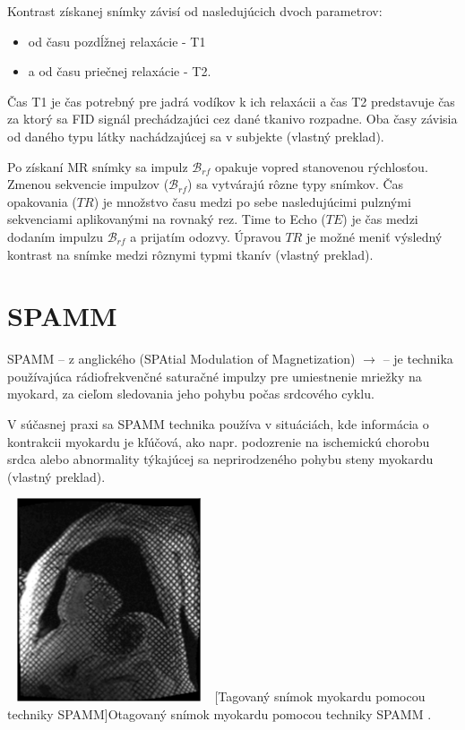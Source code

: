 Kontrast získanej snímky závisí od nasledujúcich dvoch parametrov:

\begin {itemize}
\item {od času pozdĺžnej relaxácie - T1}
\item {a od času priečnej relaxácie - T2.}
\end {itemize}

Čas T1 je čas potrebný pre jadrá vodíkov k ich relaxácii a čas T2 predstavuje čas za ktorý sa FID signál prechádzajúci cez dané tkanivo rozpadne. Oba časy závisia od daného typu látky nachádzajúcej sa v subjekte \cite{basic_principles_of_mri} (vlastný preklad).

Po získaní MR snímky sa impulz $\mathcal{B}_{rf}$ opakuje vopred stanovenou rýchlosťou. Zmenou sekvencie impulzov ($\mathcal{B}_{rf}$) sa vytvárajú rôzne typy snímkov. Čas opakovania ($TR$) je množstvo času medzi po sebe nasledujúcimi pulznými sekvenciami aplikovanými na rovnaký rez. Time to Echo ($TE$) je čas medzi dodaním impulzu $\mathcal{B}_{rf}$ a prijatím odozvy. Úpravou $TR$ je možné meniť výsledný kontrast na snímke medzi rôznymi typmi tkanív \cite{basic_principles_of_mri} (vlastný preklad). \clearpage

\section {SPAMM}

SPAMM -- z anglického (SPAtial Modulation of Magnetization) $\rightarrow$  -- je technika používajúca rádiofrekvenčné saturačné impulzy pre umiestnenie mriežky na myokard, za cieľom sledovania jeho pohybu počas srdcového cyklu.

V súčasnej praxi sa SPAMM technika používa v situáciách, kde informácia o kontrakcii myokardu je kľúčová, ako napr. podozrenie na ischemickú chorobu srdca alebo abnormality týkajúcej sa neprirodzeného pohybu steny myokardu \cite{spamm_description} (vlastný preklad).

\begin {center}
        \centering
        \includegraphics[width=6cm, height=6cm]{media/heart/tagged_heart.png}
        \captionsetup{justification=centering}
        [Tagovaný snímok myokardu pomocou techniky SPAMM]{Otagovaný snímok myokardu pomocou techniky SPAMM \cite{spamm_description}.}
\end {center}

